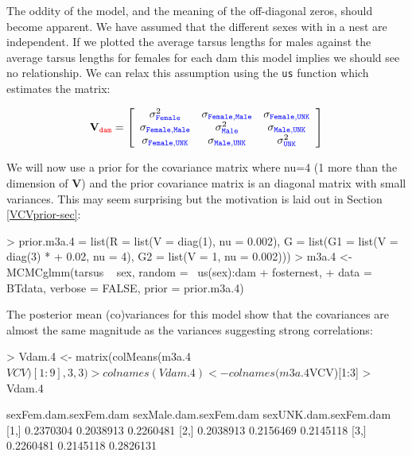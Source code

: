 \documentclass{article}
\begin{document}
The oddity of the model, and the meaning of the off-diagonal zeros, should become apparent. We have assumed that the different sexes with in a nest are independent. If we plotted the average tarsus lengths for males against the average tarsus lengths for females for each dam this model implies we should see no relationship. We can relax this assumption using the \texttt{us} function which estimates the matrix: 

\begin{displaymath}
{\bf V}_{{\color{red} \texttt{dam}}}=
\left[
\begin{array}{ccc}
\sigma^{2}_{\color{blue}\texttt{Female}}&\sigma_{\color{blue}\texttt{Female}, \texttt{Male}}&\sigma_{\color{blue}\texttt{Female}, \texttt{UNK}}\\
\sigma_{\color{blue}\texttt{Female}, \texttt{Male}}&\sigma^{2}_{\color{blue}\texttt{Male}}&\sigma_{\color{blue}\texttt{Male}, \texttt{UNK}}\\
\sigma_{\color{blue}\texttt{Female}, \texttt{UNK}}&\sigma_{\color{blue}\texttt{Male}, \texttt{UNK}}&\sigma^{2}_{\color{blue}\texttt{UNK}}\\
\end{array}
\right]
\end{displaymath}

We will now use a prior for the covariance matrix where nu=4 (1 more than the dimension of {\bf V}) and the prior covariance matrix is an diagonal matrix with small variances. This may seem surprising but the motivation is laid out in Section \ref{VCVprior-sec}: 

\begin{Schunk}
\begin{Sinput}
> prior.m3a.4 = list(R = list(V = diag(1), nu = 0.002), G = list(G1 = list(V = diag(3) * 
+     0.02, nu = 4), G2 = list(V = 1, nu = 0.002)))
> m3a.4 <- MCMCglmm(tarsus ~ sex, random = ~us(sex):dam + fosternest, 
+     data = BTdata, verbose = FALSE, prior = prior.m3a.4)
\end{Sinput}
\end{Schunk}

The posterior mean (co)variances for this model show that the covariances are almost the same magnitude as the variances suggesting strong correlations: 

\begin{Schunk}
\begin{Sinput}
> Vdam.4 <- matrix(colMeans(m3a.4$VCV)[1:9], 3, 3)
> colnames(Vdam.4) <- colnames(m3a.4$VCV)[1:3]
> Vdam.4
\end{Sinput}
\begin{Soutput}
     sexFem.dam.sexFem.dam sexMale.dam.sexFem.dam sexUNK.dam.sexFem.dam
[1,]             0.2370304              0.2038913             0.2260481
[2,]             0.2038913              0.2156469             0.2145118
[3,]             0.2260481              0.2145118             0.2826131
\end{Soutput}
\end{Schunk}
\end{document}
